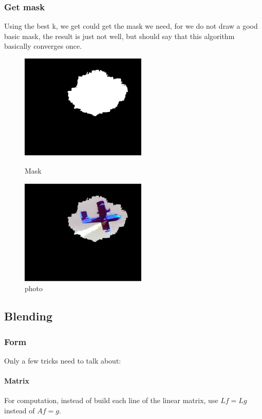 \documentclass[letterpaper,12pt]{article}
\begin{document}
\subsubsection{Get mask}
Using the best k, we get could get the mask we need, for we do not draw a good basic mask, the result is just not well, but should say that this algorithm basically converges once.
\begin{figure}[htbp]
	\centering
	\begin{minipage}[t]{0.48\textwidth}
		\centering
		\includegraphics[width=6cm]{Image/6-1.png}
		\caption{Mask}
	\end{minipage}
	\begin{minipage}[t]{0.48\textwidth}
		\centering
		\includegraphics[width=6cm]{Image/6-2.png}
		\caption{photo}
	\end{minipage}
\end{figure}
\subsection{Blending}
\subsubsection{Form}
Only a few tricks need to talk about:
\paragraph{Matrix}
For computation, instead of build each line of the linear matrix, use $Lf = Lg$ instead of $Af=g$.
\end{document}
